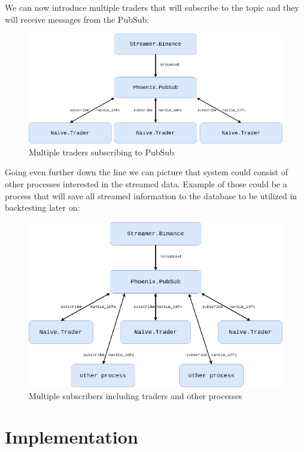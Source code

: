 \documentclass[
]{book}
\begin{document}
We can now introduce multiple traders that will subscribe to the topic and
they will receive messages from the PubSub:

\begin{figure}
\centering
\includegraphics{images/chapter_03_04_naive_trader_group.png}
\caption{Multiple traders subscribing to PubSub}
\end{figure}

Going even further down the line we can picture that system could consist of other processes interested in the streamed data. Example of those could be a process that will save all streamed information to the database to be utilized in backtesting later on:

\begin{figure}
\centering
\includegraphics{images/chapter_03_05_other_services.png}
\caption{Multiple subscribers including traders and other processes}
\end{figure}

\hypertarget{implementation}{%
\section{Implementation}\label{implementation}}
\end{document}

